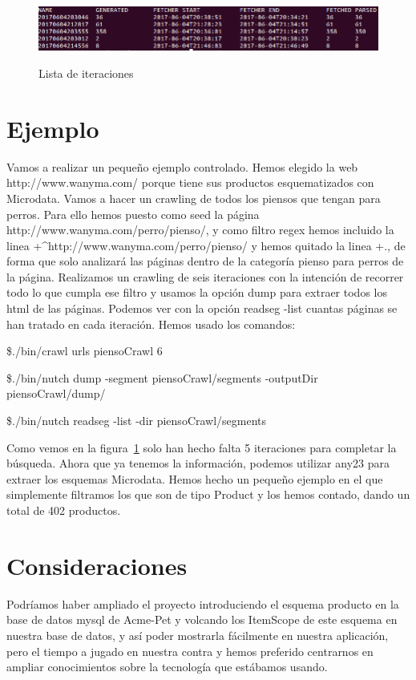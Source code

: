 \documentclass[a4paper]{article}
\begin{document}
\begin{figure}[h]
\caption{Lista de iteraciones}
\includegraphics[width=\linewidth]{lista}
\label{fig:lista}
\end{figure}

\section{Ejemplo}

Vamos a realizar un pequeño ejemplo controlado. Hemos elegido la web http://www.wanyma.com/ porque tiene sus productos esquematizados con Microdata. Vamos a hacer un crawling de todos los piensos que tengan para perros. Para ello hemos puesto como seed la página http://www.wanyma.com/perro\slash pienso/, y como filtro regex hemos incluido la linea +\^{}http://www.wanyma.com\slash perro/pienso/ y hemos quitado la linea +., de forma que solo analizará las páginas dentro de la categoría pienso para perros de la página. Realizamos un crawling de seis iteraciones con la intención de recorrer todo lo que cumpla ese filtro y usamos la opción dump para extraer todos los html de las páginas. Podemos ver con la opción readseg -list cuantas páginas se han tratado en cada iteración. Hemos usado los comandos:

\$./bin/crawl urls piensoCrawl 6

\$./bin/nutch dump -segment piensoCrawl/segments -outputDir piensoCrawl\slash dump/

\$./bin/nutch readseg -list -dir piensoCrawl/segments


Como vemos en la figura~\ref{fig:lista} solo han hecho falta 5 iteraciones para completar la búsqueda. Ahora que ya tenemos la información, podemos utilizar any23 para extraer los esquemas Microdata. Hemos hecho un pequeño ejemplo en el que simplemente filtramos los que son de tipo Product y los hemos contado, dando un total de 402 productos.

\section{Consideraciones}
Podríamos haber ampliado el proyecto introduciendo el esquema producto en la base de datos mysql de Acme-Pet y volcando los ItemScope de este esquema en nuestra base de datos, y así poder mostrarla fácilmente en nuestra aplicación, pero el tiempo a jugado en nuestra contra y hemos preferido centrarnos en ampliar conocimientos sobre la tecnología que estábamos usando.
\end{document}
